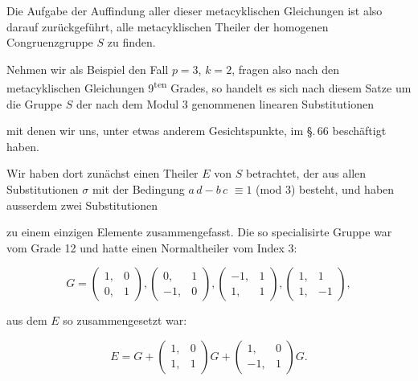 
Die Aufgabe der Auffindung aller dieser metacyklischen
Gleichungen ist also darauf zur\"uckgef\"uhrt, alle metacyklischen
Theiler der homogenen Congruenzgruppe $S$ zu finden.

Nehmen wir als Beispiel den Fall $p = 3$, $k = 2$, fragen
also nach den metacyklischen Gleichungen 9\textsuperscript{ten} Grades, so handelt
es sich nach diesem Satze um die Gruppe $S$ der nach dem
Modul 3 genommenen linearen Substitutionen


mit denen wir uns, unter etwas anderem Gesichtspunkte, im \S.\,66
besch\"aftigt haben.

Wir haben dort zun\"achst einen Theiler $E$ von $S$ betrachtet,
der aus allen Substitutionen $\sigma$ mit der Bedingung $a\,d - b\,c$
$\equiv 1$ (mod 3) besteht, und haben ausserdem zwei Substitutionen


zu einem einzigen Elemente zusammengefasst. Die so specialisirte
Gruppe war vom Grade 12 und hatte einen Normaltheiler
vom Index 3:

\[ G = \begin{pmatrix} 1, & 0 \\ 0, & 1 \end{pmatrix}, \begin{pmatrix} 0, & 1 \\ -1, & 0 \end{pmatrix}, \begin{pmatrix} -1, & 1 \\ 1, & 1 \end{pmatrix}, \begin{pmatrix} 1, & 1 \\ 1, & -1 \end{pmatrix}, \]

aus dem $E$ so zusammengesetzt war:

\[ E = G + \begin{pmatrix} 1, & 0 \\ 1, & 1 \end{pmatrix} G + \begin{pmatrix} 1, & 0 \\ -1, & 1 \end{pmatrix} G. \]

